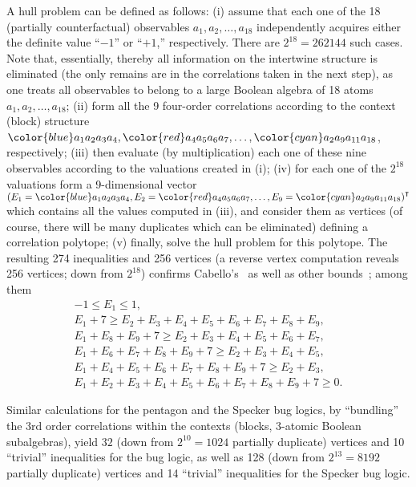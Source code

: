 A hull problem can be defined as follows:
(i) assume that each one of the 18 (partially counterfactual) observables
$a_1,a_2, \ldots ,a_{18}$ independently acquires either the definite value
``$-1$''
or
``$+1$,'' respectively.
There are $2^{18}=262144$ such cases. Note that, essentially, thereby all information on the intertwine structure is eliminated
(the only remains are in the correlations taken in the next step),
as one treats all observables to belong to a large Boolean algebra of 18 atoms  $a_1,a_2, \ldots ,a_{18}$;
(ii) form all the 9 four-order correlations according to the context (block) structure
${\color{blue}a_1 a_2 a_3 a_4}, {\color{red}a_4 a_5 a_6 a_7}, \ldots , {\color{cyan}a_2 a_9 a_{11} a_{18}}$, respectively;
(iii) then evaluate (by multiplication) each one of these nine observables according to the valuations created in (i);
(iv) for each one of the $2^{18}$ valuations form a 9-dimensional vector
$\left( E_1 ={\color{blue}a_1 a_2 a_3 a_4}, E_2={\color{red}a_4 a_5 a_6 a_7}, \ldots , E_9={\color{cyan}a_2 a_9 a_{11} a_{18}}\right)^\intercal$
which contains all the values computed in (iii),
and consider them as vertices (of course, there will be many duplicates which can be eliminated) defining a correlation polytope;
(v) finally, solve the hull problem for this polytope.
The resulting 274 inequalities and 256 vertices (a reverse vertex computation reveals 256 vertices; down from $2^{18}$)
confirms  Cabello's~\cite{cabello:210401}
as well as other bounds~\cite[Eqs.~(8)]{svozil-2016-s}; among them
\begin{equation}
\begin{split}
-1 \leq  E_1 \leq 1, \\
E_1+7\geq E_2+E_3+E_4+E_5+E_6+E_7+E_8+E_9, \\
E_1+E_8+E_9+7\geq E_2+E_3+E_4+E_5+E_6+E_7, \\
E_1+E_6+E_7+E_8+E_9+7\geq E_2+E_3+E_4+E_5, \\
E_1+E_4+E_5+E_6+E_7+E_8+E_9+7\geq E_2+E_3, \\
E_1+E_2+E_3+E_4+E_5+E_6+E_7+E_8+E_9+7\geq 0
.
\end{split}
\label{2015-s-e11}
\end{equation}

Similar calculations for the pentagon and the Specker bug logics,
by ``bundling'' the 3rd order correlations within the contexts (blocks, 3-atomic Boolean subalgebras), yield
$32$
(down from $2^{10}=1024$ partially duplicate)
vertices and 10 ``trivial'' inequalities for the bug logic,
as well as 128
(down from $2^{13}=8192$ partially duplicate)
vertices and 14 ``trivial'' inequalities for the Specker bug logic.


